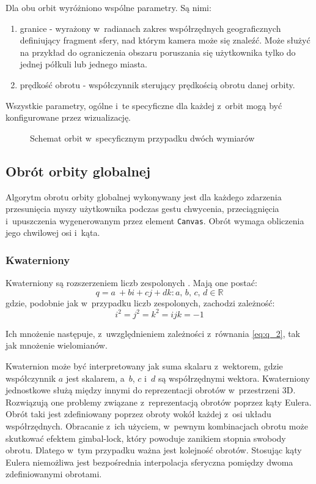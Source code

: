 Dla obu orbit wyróżniono wspólne parametry. Są nimi:
\begin{enumerate}
    \item granice - wyrażony w~radianach zakres współrzędnych geograficznych definiujący fragment sfery, nad którym kamera może się znaleźć. Może służyć na przykład do ograniczenia obszaru poruszania się użytkownika tylko do jednej półkuli lub jednego miasta.
    \item prędkość obrotu - współczynnik sterujący prędkością obrotu danej orbity.
\end{enumerate}

Wszystkie parametry, ogólne i~te specyficzne dla każdej z~orbit mogą być konfigurowane przez wizualizację.

\begin{figure}[]
    \centering
    
    \caption{Schemat orbit w~specyficznym przypadku dwóch wymiarów}
    \label{fig:orbits}
\end{figure}



\subsection{Obrót orbity globalnej}

Algorytm obrotu orbity globalnej wykonywany jest dla każdego zdarzenia przesunięcia myszy użytkownika podczas gestu chwycenia, przeciągnięcia i~upuszczenia wygenerowanym przez element \texttt{Canvas}. Obrót wymaga obliczenia jego chwilowej osi i~kąta.

\subsubsection{Kwaterniony}
Kwaterniony są rozszerzeniem liczb zespolonych \cite{Quaternions}. Mają one postać:
\begin{equation}
    \label{eq:q_1}
    q = a~+ bi + cj + dk : a,\,b,\,c,\,d\in\mathbb{R}
\end{equation}
gdzie, podobnie jak w~przypadku liczb zespolonych, zachodzi zależność:
\begin{equation}
    \label{eq:q_2}
    i^2 = j^2 = k^2 = ijk =  -1
\end{equation}

Ich mnożenie następuje, z~uwzględnieniem zależności z~równania \ref{eq:q_2}, tak jak mnożenie wielomianów.

Kwaternion może być interpretowany jak suma skalaru z~wektorem, gdzie współczynnik $a$ jest skalarem, a~$b$, $c$ i~$d$ są współrzędnymi wektora. Kwaterniony jednostkowe służą między innymi do reprezentacji obrotów w~przestrzeni 3D. Rozwiązują one problemy związane z~reprezentacją obrotów poprzez kąty Eulera. Obrót taki jest zdefiniowany poprzez obroty wokół każdej z~osi układu współrzędnych. Obracanie z~ich użyciem, w~pewnym kombinacjach obrotu może skutkować efektem gimbal-lock, który powoduje zanikiem stopnia swobody obrotu. Dlatego w~tym przypadku ważna jest kolejność obrotów. Stosując kąty Eulera niemożliwa jest bezpośrednia interpolacja sferyczna pomiędzy dwoma zdefiniowanymi obrotami.

